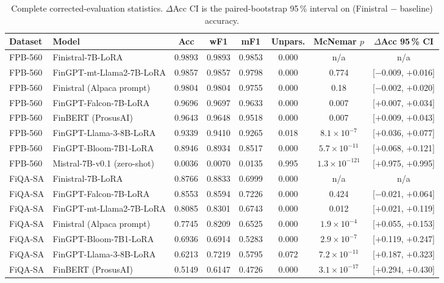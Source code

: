 \documentclass[a4paper]{article}
\begin{document}
\begin{table}[htbp]
\centering
\caption{Complete corrected-evaluation statistics. $\Delta$Acc CI is the paired-bootstrap 95\,\% interval on (Finistral $-$ baseline) accuracy.}
\label{tab:full-stats}
{\fontsize{8.5}{10.5}\selectfont
\begin{tabular}{llcccccc}
\toprule
\textbf{Dataset} & \textbf{Model} & \textbf{Acc} & \textbf{wF1} & \textbf{mF1} & \textbf{Unpars.} & \textbf{McNemar $p$} & \textbf{$\Delta$Acc 95\,\% CI} \\
\midrule
FPB-560 & Finistral-7B-LoRA & 0.9893 & 0.9893 & 0.9853 & 0.000 & n/a & n/a \\
FPB-560 & FinGPT-mt-Llama2-7B-LoRA & 0.9857 & 0.9857 & 0.9798 & 0.000 & 0.774 & [$-$0.009, $+$0.016] \\
FPB-560 & Finistral (Alpaca prompt) & 0.9804 & 0.9804 & 0.9755 & 0.000 & 0.18 & [$-$0.002, $+$0.020] \\
FPB-560 & FinGPT-Falcon-7B-LoRA & 0.9696 & 0.9697 & 0.9633 & 0.000 & 0.007 & [$+$0.007, $+$0.034] \\
FPB-560 & FinBERT (ProsusAI) & 0.9643 & 0.9648 & 0.9518 & 0.000 & 0.007 & [$+$0.009, $+$0.043] \\
FPB-560 & FinGPT-Llama-3-8B-LoRA & 0.9339 & 0.9410 & 0.9265 & 0.018 & $8.1\times10^{-7}$ & [$+$0.036, $+$0.077] \\
FPB-560 & FinGPT-Bloom-7B1-LoRA & 0.8946 & 0.8934 & 0.8517 & 0.000 & $5.7\times10^{-11}$ & [$+$0.068, $+$0.121] \\
FPB-560 & Mistral-7B-v0.1 (zero-shot) & 0.0036 & 0.0070 & 0.0135 & 0.995 & $1.3\times10^{-121}$ & [$+$0.975, $+$0.995] \\
\midrule
FiQA-SA & Finistral-7B-LoRA & 0.8766 & 0.8833 & 0.6999 & 0.000 & n/a & n/a \\
FiQA-SA & FinGPT-Falcon-7B-LoRA & 0.8553 & 0.8594 & 0.7226 & 0.000 & 0.424 & [$-$0.021, $+$0.064] \\
FiQA-SA & FinGPT-mt-Llama2-7B-LoRA & 0.8085 & 0.8301 & 0.6743 & 0.000 & 0.012 & [$+$0.021, $+$0.119] \\
FiQA-SA & Finistral (Alpaca prompt) & 0.7745 & 0.8209 & 0.6525 & 0.000 & $1.9\times10^{-4}$ & [$+$0.055, $+$0.153] \\
FiQA-SA & FinGPT-Bloom-7B1-LoRA & 0.6936 & 0.6914 & 0.5283 & 0.000 & $2.9\times10^{-7}$ & [$+$0.119, $+$0.247] \\
FiQA-SA & FinGPT-Llama-3-8B-LoRA & 0.6213 & 0.7219 & 0.5795 & 0.072 & $7.2\times10^{-11}$ & [$+$0.187, $+$0.323] \\
FiQA-SA & FinBERT (ProsusAI) & 0.5149 & 0.6147 & 0.4726 & 0.000 & $3.1\times10^{-17}$ & [$+$0.294, $+$0.430] \\

\end{tabular}}
\end{table}
\end{document}
